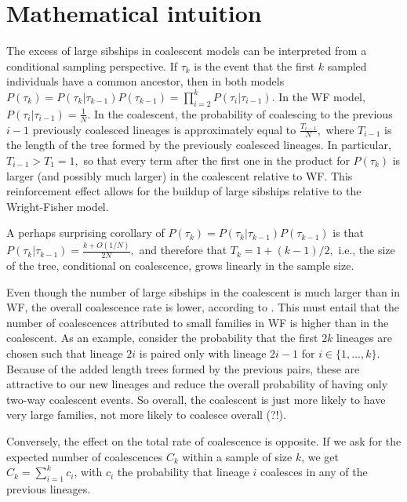 \documentclass[review,nonatbib]{elsarticle}
\newcommand{\sgcomment}[1]{{\color{red}{SG: #1}}}
\begin{document}
\section{Mathematical intuition}
The excess of large sibships in coalescent models can be interpreted from a conditional sampling perspective.  If $\tau_k$ is the event that the 
first $k$ sampled individuals have a common ancestor, then in both models $P(\tau_k) =  P(\tau_k|\tau_{k-1}) P(\tau_{k-1}) = \prod_{i=2}^k P(\tau_i|\tau_{i-1}).$ In the
 WF model, $P(\tau_i|\tau_{i-1}) = \frac{1}{N}.$ In the coalescent, the probability of coalescing to the previous $i-1$ previously coalesced lineages is approximately equal to 
$\frac{T_{i-1}}{N},$ where $T_{i-1}$ is the length of the tree formed by the previously coalesced lineages. In particular, $T_{i-1}>T_{1}=1,$ so that every term after the first one
 in the product for $P(\tau_k)$ is larger (and possibly much larger) in the coalescent relative to WF.  This reinforcement effect allows for the buildup of
 large sibships relative to the Wright-Fisher model. 
 
 A perhaps surprising corollary of $P(\tau_k) =  P(\tau_k|\tau_{k-1}) P(\tau_{k-1})$ is that $P(\tau_k|\tau_{k-1})= \frac{k+O(1/N)}{2 N},$ 
 and therefore that $T_k = 1+(k-1)/2,$ i.e., the size of the tree, conditional on coalescence,
  grows linearly in the sample size. \sgcomment{This was confusing to me at first, but it does follow from the proposition. I feel like there must be an intuitive argument here, but can't find it}
 
 Even though the number of large sibships in the coalescent is much larger than in WF,  the overall coalescence rate is lower, according to \cite{Bhaskar}. 
 This must entail that the number of coalescences attributed to small families in WF is higher than in the coalescent. As an example, consider the probability 
 that the first $2k$ lineages are chosen such that lineage $2i$ is paired only with lineage $2i-1$ for $i \in \{1,\ldots,k\}.$ Because of the added length 
 trees formed by the previous pairs, these are attractive to our new lineages and reduce the overall probability of having only two-way coalescent events.
 \sgcomment{This is correct and could be formalized, but a fairly weak argument. I'd rather show concretely that the overall rate is reduced. 
 Maybe it can be done with a lookdown construction.}  So overall, the coalescent is just more likely to have very large families, not more likely to coalesce overall (?!). 
  
  
 Conversely, the effect on the total rate of coalescence is opposite. If we ask for the expected number of coalescences $C_k$ 
 within a sample of size $k$, we get $C_k= \sum_{i=1}^k  c_i$, with $c_i$ the probability that lineage $i$ coalesces in any of the previous lineages. 
\end{document}
